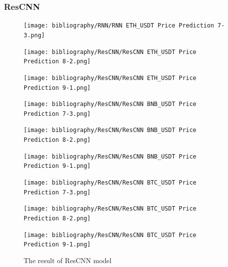 \documentclass{ieeeojies}
\begin{document}
\subsubsection{ResCNN}
\begin{figure}[H]
    \centering
    \begin{minipage}{0.15\textwidth}
    \centering
    \texttt{[image: bibliography/RNN/RNN ETH\_USDT Price Prediction 7-3.png]}
    \end{minipage}
    \hfill
    \begin{minipage}{0.15\textwidth}
    \centering
    \texttt{[image: bibliography/ResCNN/ResCNN ETH\_USDT Price Prediction 8-2.png]}
    \end{minipage}
    \hfill
    \begin{minipage}{0.15\textwidth}
    \centering
    \texttt{[image: bibliography/ResCNN/ResCNN ETH\_USDT Price Prediction 9-1.png]}
    \end{minipage}
    \centering
    \begin{minipage}{0.15\textwidth}
    \centering
    \texttt{[image: bibliography/ResCNN/ResCNN BNB\_USDT Price Prediction 7-3.png]}
    \end{minipage}
    \hfill
    \begin{minipage}{0.15\textwidth}
    \centering
    \texttt{[image: bibliography/ResCNN/ResCNN BNB\_USDT Price Prediction 8-2.png]}
    \end{minipage}
    \hfill
    \begin{minipage}{0.15\textwidth}
    \centering
    \texttt{[image: bibliography/ResCNN/ResCNN BNB\_USDT Price Prediction 9-1.png]}
    \end{minipage}
    \centering
    \begin{minipage}{0.15\textwidth}
    \centering
    \texttt{[image: bibliography/ResCNN/ResCNN BTC\_USDT Price Prediction 7-3.png]}
    \end{minipage}
    \hfill
    \begin{minipage}{0.15\textwidth}
    \centering
    \texttt{[image: bibliography/ResCNN/ResCNN BTC\_USDT Price Prediction 8-2.png]}
    \end{minipage}
    \hfill
    \begin{minipage}{0.15\textwidth}
    \centering
    \texttt{[image: bibliography/ResCNN/ResCNN BTC\_USDT Price Prediction 9-1.png]}
    \end{minipage}
    \caption{The result of ResCNN model}
    \label{fig:enter-label}
\end{figure}
\end{document}

